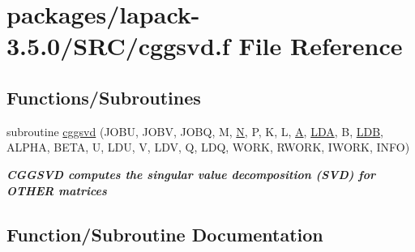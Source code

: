 \hypertarget{cggsvd_8f}{}\section{packages/lapack-\/3.5.0/\+S\+R\+C/cggsvd.f File Reference}
\label{cggsvd_8f}
\subsection*{Functions/\+Subroutines}
\begin{DoxyCompactItemize}
\item 
subroutine \hyperlink{cggsvd_8f_af6236f1d63e3f1e50b8a848ffae74e7b}{cggsvd} (J\+O\+B\+U, J\+O\+B\+V, J\+O\+B\+Q, M, \hyperlink{polmisc_8c_a0240ac851181b84ac374872dc5434ee4}{N}, P, K, L, \hyperlink{classA}{A}, \hyperlink{example__user_8c_ae946da542ce0db94dced19b2ecefd1aa}{L\+D\+A}, B, \hyperlink{example__user_8c_a50e90a7104df172b5a89a06c47fcca04}{L\+D\+B}, A\+L\+P\+H\+A, B\+E\+T\+A, U, L\+D\+U, V, L\+D\+V, Q, L\+D\+Q, W\+O\+R\+K, R\+W\+O\+R\+K, I\+W\+O\+R\+K, I\+N\+F\+O)
\begin{DoxyCompactList}\small\item\em {\bfseries  C\+G\+G\+S\+V\+D computes the singular value decomposition (S\+V\+D) for O\+T\+H\+E\+R matrices} \end{DoxyCompactList}\end{DoxyCompactItemize}


\subsection{Function/\+Subroutine Documentation}
\hypertarget{cggsvd_8f_af6236f1d63e3f1e50b8a848ffae74e7b}{}
